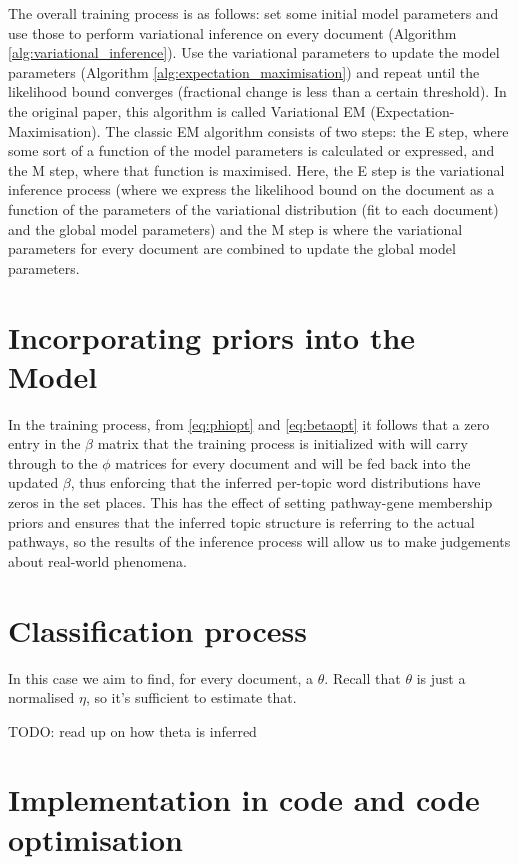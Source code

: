 \documentclass[12pt,a4paper,twoside,openright]{report}
\begin{document}
The overall training process is as follows: set some initial model parameters and use those to perform variational inference on every document (Algorithm \ref{alg:variational_inference}). Use the variational parameters to update the model parameters (Algorithm \ref{alg:expectation_maximisation}) and repeat until the likelihood bound converges (fractional change is less than a certain threshold). In the original paper, this algorithm is called Variational EM (Expectation-Maximisation). The classic EM algorithm consists of two steps: the E step, where some sort of a function of the model parameters is calculated or expressed, and the M step, where that function is maximised. Here, the E step is the variational inference process (where we express the likelihood bound on the document as a function of the parameters of the variational distribution (fit to each document) and the global model parameters) and the M step is where the variational parameters for every document are combined to update the global model parameters.



\section{Incorporating priors into the Model}

In the training process, from \eqref{eq:phiopt} and \eqref{eq:betaopt} it follows that a zero entry in the $\beta$ matrix that the training process is initialized with will carry through to the $\phi$ matrices for every document and will be fed back into the updated $\beta$, thus enforcing that the inferred per-topic word distributions have zeros in the set places. This has the effect of setting pathway-gene membership priors and ensures that the inferred topic structure is referring to the actual pathways, so the results of the inference process will allow us to make judgements about real-world phenomena.

\section{Classification process}

In this case we aim to find, for every document, a $\theta$. Recall that $\theta$ is just a normalised $\eta$, so it's sufficient to estimate that.



TODO: read up on how theta is inferred

\section{Implementation in code and code optimisation}
\end{document}
